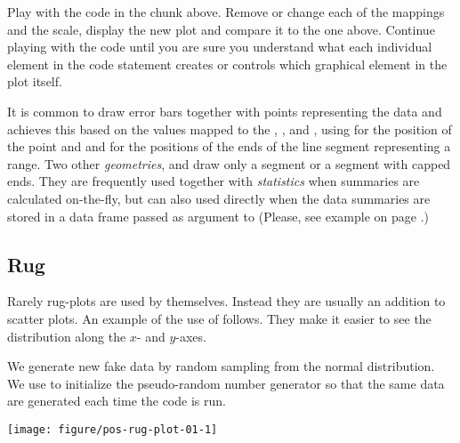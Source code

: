 \documentclass[krantz2]{krantz}\usepackage{knitr}%
\begin{document}
\begin{playground}
Play with the code in the chunk above. Remove or change each of the mappings and the scale, display the new plot and compare it to the one above. Continue playing with the code until you are sure you understand what each individual element in the code statement creates or controls which graphical element in the plot itself.
\end{playground}

It is common to draw error bars together with points representing the data and  achieves this based on the values mapped to the , ,  and , using  for the position of the point and  and  for the positions of the ends of the line segment representing a range. Two other \emph{geometries},  and   draw only a segment or a segment with capped ends. They are frequently used together with \emph{statistics} when summaries are calculated on-the-fly, but can also used directly when the data summaries are stored in a data frame passed as argument to  (Please, see example on page \pageref{exmpl:plot:errorbar:precalc}.)

\subsection{Rug}

Rarely rug-plots are used by themselves. Instead they are usually an addition to
scatter plots. An example of the use of  follows. They make it easier to see the distribution
along the $x$- and $y$-axes.

We generate new fake data by random sampling from the normal distribution. We use  to initialize the pseudo-random number generator so that
the same data are generated each time the code is run.

\begin{knitrout}\footnotesize
{}\color{fgcolor}\begin{kframe}
\begin{alltt}
\hlstd{(} 
       \hlstd{(}     \hlstd{=}  \hlopt{+}
  \hlstd{()} \hlopt{+}
  \hlstd{()}
\end{alltt}
\end{kframe}

{\centering \texttt{[image: figure/pos-rug-plot-01-1]} 

}



\end{knitrout}
\end{document}
